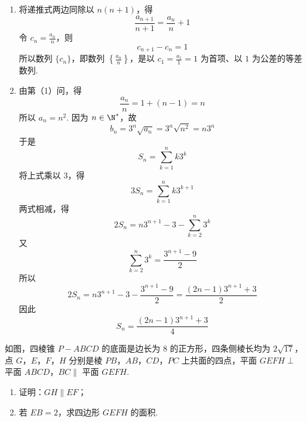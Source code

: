 \begin{solution}
\begin{enumerate}
\item 将递推式两边同除以 \(n(n+1)\)，得
\[
\frac{a_{n+1}}{n+1}=\frac{a_n}{n}+1
\]
令 \(c_n=\frac{a_n}{n}\)，则
\[
c_{n+1}-c_n=1
\]
所以数列 \(\{c_n\}\)，即数列 \(\left\{\frac{a_n}{n}\right\}\)，是以 \(c_1=\frac{a_1}{1}=1\) 为首项、以 \(1\) 为公差的等差数列.

\item 由第（1）问，得
\[
\frac{a_n}{n}=1+(n-1)=n
\]
所以 \(a_n=n^2\). 因为 \(n\in\N^*\)，故
\[
b_n=3^n\sqrt{a_n}=3^n\sqrt{n^2}=n3^n
\]
于是
\[
S_n=\sum_{k=1}^{n}k3^k
\]
将上式乘以 \(3\)，得
\[
3S_n=\sum_{k=1}^{n}k3^{k+1}
\]
两式相减，得
\[
2S_n=n3^{n+1}-3-\sum_{k=2}^{n}3^k
\]
又
\[
\sum_{k=2}^{n}3^k=\frac{3^{n+1}-9}{2}
\]
所以
\[
2S_n=n3^{n+1}-3-\frac{3^{n+1}-9}{2}
=\frac{(2n-1)3^{n+1}+3}{2}
\]
因此
\[
S_n=\frac{(2n-1)3^{n+1}+3}{4}
\]
\end{enumerate}
\end{solution}


\begin{problem}
如图，四棱锥 \(P - ABCD\) 的底面是边长为 \(8\) 的正方形，四条侧棱长均为 \(2\sqrt{17}\)，点 \(G\)，\(E\)，\(F\)，\(H\) 分别是棱 \(PB\)，\(AB\)，\(CD\)，\(PC\) 上共面的四点，平面 \(GEFH \perp\) 平面 \(ABCD\)，\(BC \parallel\) 平面 \(GEFH\).

\begin{enumerate}
\item 证明：\(GH \parallel EF\)；
\item 若 \(EB = 2\)，求四边形 \(GEFH\) 的面积.
\end{enumerate}

\end{problem}

